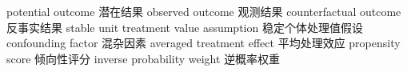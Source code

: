 {potential outcome}
{潜在结果}
{observed outcome}
{观测结果}
{counterfactual outcome}
{反事实结果}
{stable unit treatment value assumption}
{稳定个体处理值假设}
{confounding factor}
{混杂因素}
{averaged treatment effect}
{平均处理效应}
{propensity score}
{倾向性评分}
{inverse probability weight}
{逆概率权重}